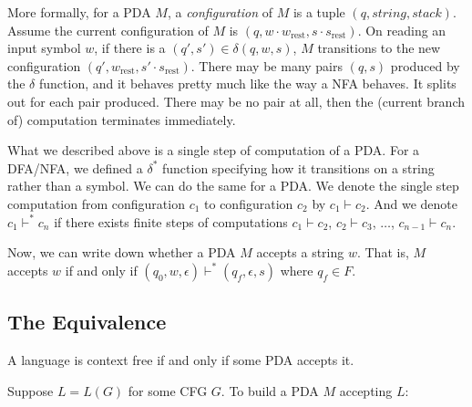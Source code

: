 \documentclass[11pt]{article}
\begin{document}
More formally, for a PDA $M$, a \emph{configuration} of $M$ is a tuple $(q,string,stack)$. Assume
the current configuration of $M$ is $(q,w \cdot w_{\text{rest}},s \cdot s_{\text{rest}})$. On
reading an input symbol $w$, if there is a $(q',s') \in \delta(q,w,s)$, $M$ transitions to the
new configuration $(q',w_{\text{rest}},s' \cdot s_{\text{rest}})$. There may be many pairs
$(q,s)$ produced by the $\delta$ function, and it behaves pretty much like the way a NFA behaves.
It splits out for each pair produced. There may be no pair at all, then the (current branch of)
computation terminates immediately.

What we described above is a single step of computation of a PDA. For a DFA/NFA, we defined a
$\delta^\ast$ function specifying how it transitions on a string rather than a symbol. We can
do the same for a PDA. We denote the single step computation from configuration $c_1$ to
configuration $c_2$ by $c_1 \vdash c_2$. And we denote $c_1 \vdash^\ast c_n$ if there exists
finite steps of computations $c_1 \vdash c_2$, $c_2 \vdash c_3$, $\dots$, $c_{n-1} \vdash c_n$.

Now, we can write down whether a PDA $M$ accepts a string $w$. That is, $M$ accepts $w$ if and only
if $(q_0,w,\epsilon) \vdash^\ast (q_f,\epsilon,s)$ where $q_f \in F$.

\subsection{The Equivalence}

\begin{theorem}
A language is context free if and only if some PDA accepts it.
\end{theorem}

Suppose $L = L(G)$ for some CFG $G$. To build a PDA $M$ accepting $L$:
\end{document}
